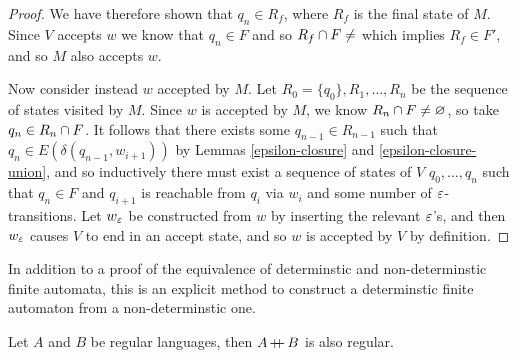 \begin{proof}
    We have therefore shown that $q_n \in R_f$, where $R_f$ is the final state of $M$. Since $V$ accepts $w$ we know that $q_n \in F$ and so $R_f \intersection F \neq \empty$ which implies $R_f \in F'$, and so $M$ also accepts $w$.

    Now consider instead $w$ accepted by $M$. Let $R_0 = \{q_0\}, R_1, \ldots, R_n$ be the sequence of states visited by $M$. Since $w$ is accepted by $M$, we know $R_n \cap F \neq \varnothing$, so take $q_n \in R_n \cap F$. It follows that there exists some $q_{n-1} \in R_{n-1}$ such that $q_n \in E(\delta(q_{n-1}, w_{i+1}))$ by Lemmas \ref{epsilon-closure} and \ref{epsilon-closure-union}, and so inductively there must exist a sequence of states of $V$ $q_0, \ldots, q_n$ such that $q_n \in F$ and $q_{i+1}$ is reachable from $q_i$ via $w_i$ and some number of $\varepsilon$-transitions. Let $w_{\varepsilon}$ be constructed from $w$ by inserting the relevant $\varepsilon$'s, and then $w_{\varepsilon}$ causes $V$ to end in an accept state, and so $w$ is accepted by $V$ by definition.
\end{proof}

\begin{rmk}
    In addition to a proof of the equivalence of determinstic and non-determinstic finite automata, this is an explicit method to construct a determinstic finite automaton from a non-determinstic one.
\end{rmk}

\begin{thm}\label{regular-language-concatenation}
    Let $A$ and $B$ be regular languages, then $A \kern-0.2ex+\kern-1.5ex+\kern0.4ex B$ is also regular.
\end{thm}

